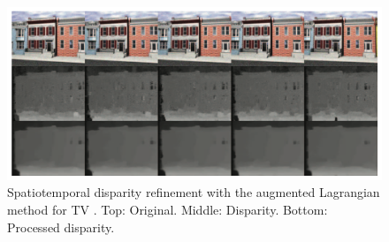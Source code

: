 \begin{figure}[h!]
  \centering
  \includegraphics[width=1.0\textwidth]{src/images/spatiotemporal.png}
  \caption[Spatiotemporal disparity refinement]{Spatiotemporal disparity refinement with the augmented Lagrangian method for TV \citep{khoshabeh2011spatio}. Top: Original. Middle: Disparity. Bottom: Processed disparity.}
  \label{fig:spatiotemporal}
\end{figure}

